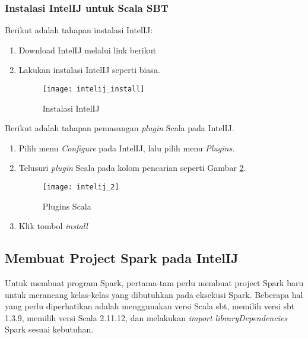 \newpage
\subsubsection{Instalasi IntelIJ untuk Scala SBT}
Berikut adalah tahapan instalasi IntelIJ:

\begin{enumerate}
\item Download IntelIJ melalui link berikut \\

\item Lakukan instalasi IntelIJ seperti biasa.
\begin{figure}[H]
	\centering
	\texttt{[image: intelij\_install]}
	\caption{Instalasi IntelIJ}
	\label{fig:intelij_install}
\end{figure}

\end{enumerate}

\noindent Berikut adalah tahapan pemasangan \textit{plugin} Scala pada IntelIJ.

\begin{enumerate}

\item Pilih menu \textit{Configure} pada IntelIJ, lalu pilih menu \textit{Plugins}.

\item Telusuri \textit{plugin} Scala pada kolom pencarian seperti Gambar \ref{fig:intelij_2}.
\begin{figure}[H]
	\centering
	\texttt{[image: intelij\_2]}
	\caption{Plugins Scala}
	\label{fig:intelij_2}
\end{figure}

\item Klik tombol \textit{install}

\end{enumerate}

\newpage
\subsection{Membuat Project Spark pada IntelIJ}
Untuk membuat program Spark, pertama-tam perlu membuat project Spark baru untuk merancang kelas-kelas yang dibutuhkan pada eksekusi Spark. Beberapa hal yang perlu diperhatikan adalah menggunakan versi Scala sbt, memilih versi sbt 1.3.9, memilih versi Scala 2.11.12, dan melakukan \textit{import libraryDependencies} Spark sesuai kebutuhan.\\

